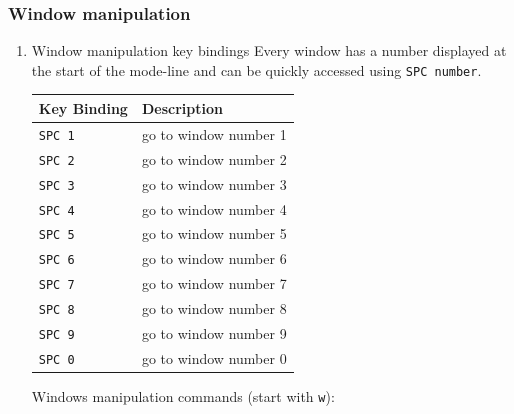 \documentclass[11pt]{article}
\begin{document}
\subsubsection{Window manipulation}
\label{sec:org41e6e73}
\begin{enumerate}
\item Window manipulation key bindings
\label{sec:orga5d8697}
Every window has a number displayed at the start of the mode-line and
can be quickly accessed using \texttt{SPC number}.

\begin{center}
\begin{tabular}{ll}
Key Binding & Description\\
\hline
\texttt{SPC 1} & go to window number 1\\
\texttt{SPC 2} & go to window number 2\\
\texttt{SPC 3} & go to window number 3\\
\texttt{SPC 4} & go to window number 4\\
\texttt{SPC 5} & go to window number 5\\
\texttt{SPC 6} & go to window number 6\\
\texttt{SPC 7} & go to window number 7\\
\texttt{SPC 8} & go to window number 8\\
\texttt{SPC 9} & go to window number 9\\
\texttt{SPC 0} & go to window number 0\\
\end{tabular}
\end{center}

Windows manipulation commands (start with \texttt{w}):


\end{enumerate}
\end{document}
